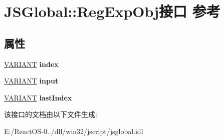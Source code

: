 \hypertarget{interface_j_s_global_1_1_reg_exp_obj}{}\section{J\+S\+Global\+:\+:Reg\+Exp\+Obj接口 参考}
\label{interface_j_s_global_1_1_reg_exp_obj}
\subsection*{属性}
\begin{DoxyCompactItemize}
\item 
\mbox{\label{interface_j_s_global_1_1_reg_exp_obj_a4cff3e0922381f17cf4c349294f544dd}} 
\hyperlink{structtag_v_a_r_i_a_n_t}{V\+A\+R\+I\+A\+NT} {\bfseries index}
\item 
\mbox{\label{interface_j_s_global_1_1_reg_exp_obj_a36ca098d646c341d3392213b853f9c77}} 
\hyperlink{structtag_v_a_r_i_a_n_t}{V\+A\+R\+I\+A\+NT} {\bfseries input}
\item 
\mbox{\label{interface_j_s_global_1_1_reg_exp_obj_aac55d62f82304eaee01ff1b3d2dc84d4}} 
\hyperlink{structtag_v_a_r_i_a_n_t}{V\+A\+R\+I\+A\+NT} {\bfseries last\+Index}
\end{DoxyCompactItemize}


该接口的文档由以下文件生成\+:\begin{DoxyCompactItemize}
\item 
E\+:/\+React\+O\+S-\/0../dll/win32/jscript/jsglobal.\+idl\end{DoxyCompactItemize}
